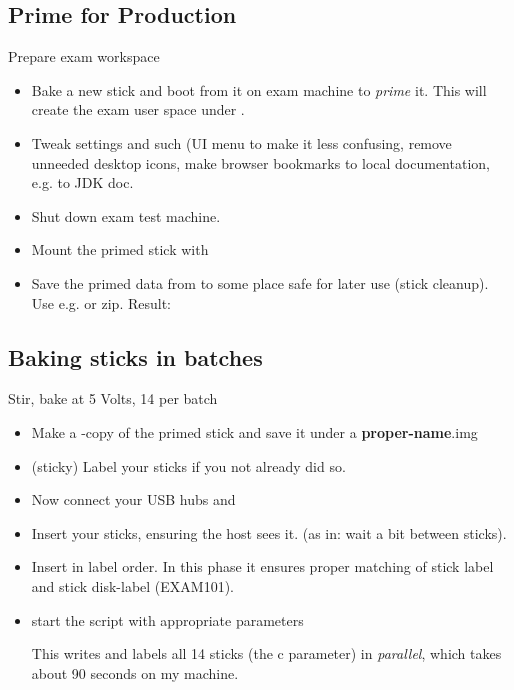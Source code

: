\subsection[Production]{Prime for Production}
\begin{frame}{Prepare exam workspace}

  \begin{itemize}  \item Bake a new stick and boot from it on exam machine to \textit{prime} it. This
    will create the exam user space under .
  \item Tweak settings and such (UI menu to make it less confusing,
    remove unneeded desktop icons, make browser bookmarks to local
    documentation, e.g. to JDK doc.
  \item Shut down exam test machine.
  \item Mount the primed stick with 
    
  \item Save the primed data  from  to some place safe
    for later use (stick cleanup). Use e.g.  or
    zip. Result: 
\end{itemize}
\end{frame}

\subsection[Baking]{Baking sticks in batches}
\begin{frame}[shrink]{Stir, bake at 5 Volts, 14 per batch}
  \begin{itemize}
  \item Make a -copy of the primed stick and save it under a
    {\ttfamily\textbf{proper-name}.img}
    
  \item (sticky) Label your sticks if you not already did so.
  \item Now connect your USB hubs and
  \item Insert your sticks, ensuring the host sees it. (as in: wait a
    bit between sticks).
  \item Insert in label
    order. In this phase it ensures proper matching of stick label and
    stick disk-label (EXAM101).
  \item start the  script with appropriate parameters
    
    This writes and labels all 14 sticks (the c parameter) in \textit{parallel},
    which takes about 90 seconds on my machine.
  \end{itemize}
\end{frame}

